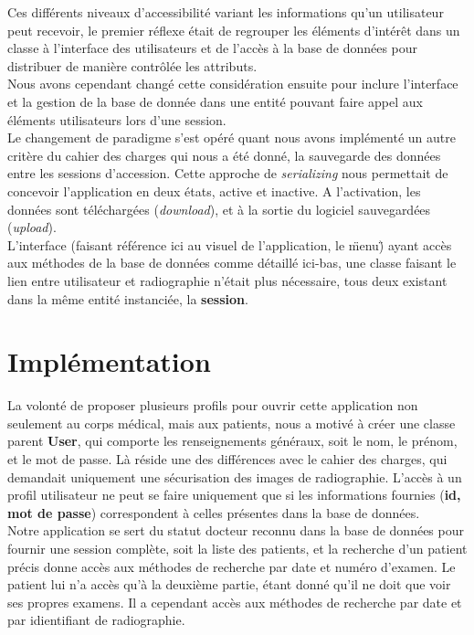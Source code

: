 \documentclass[12pt,a4paper]{article}
\begin{document}
\begin{multicols}{2}
		Ces différents niveaux d'accessibilité variant les informations qu'un utilisateur peut recevoir, le premier réflexe était de regrouper les éléments d'intérêt dans un classe à l'interface des utilisateurs et de l'accès à la base de données pour distribuer de manière contrôlée les attributs. \\
				
		Nous avons cependant changé cette considération ensuite pour inclure l'interface et la gestion de la base de donnée dans une entité pouvant faire appel aux éléments utilisateurs lors d'une session. \\
				
		Le changement de paradigme s'est opéré quant nous avons implémenté un autre critère du cahier des charges qui nous a été donné, la sauvegarde des données entre les sessions d'accession. Cette approche de \textit{serializing} nous permettait de concevoir l'application en deux états, active et inactive. A l'activation, les données sont téléchargées (\textit{download}), et à la sortie du logiciel sauvegardées (\textit{upload}). \\
				
		L'interface (faisant référence ici au visuel de l'application, le \"menu\") ayant accès aux méthodes de la base de données comme détaillé ici-bas, une classe faisant le lien entre utilisateur et radiographie n'était plus nécessaire, tous deux existant dans la même entité instanciée, la \textbf{session}.
		
		
				
				
		\section{Implémentation}
				
		La volonté de proposer plusieurs profils pour ouvrir cette application non seulement au corps médical, mais aux patients, nous a motivé à créer une classe parent \textbf{User}, qui comporte les renseignements généraux, soit le nom, le prénom, et le mot de passe. Là réside une des différences avec le cahier des charges, qui demandait uniquement une sécurisation des images de radiographie. L'accès à un profil utilisateur ne peut se faire uniquement que si les informations fournies (\textbf{id, mot de passe}) correspondent à celles présentes dans la base de données. \\
				
		Notre application se sert du statut docteur reconnu dans la base de données pour fournir une session complète, soit la liste des patients, et la recherche d'un patient précis donne accès aux méthodes de recherche par date et numéro d'examen. Le patient lui n'a accès qu'à la deuxième partie, étant donné qu'il ne doit que voir ses propres examens. Il a cependant accès aux méthodes de recherche par date et par idientifiant de radiographie.\\
				

\end{multicols}
\end{document}
